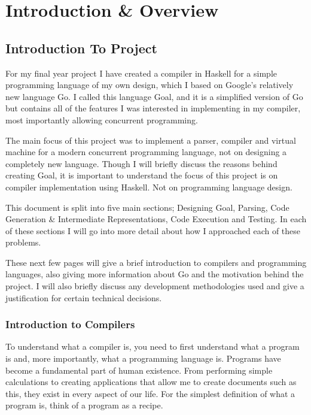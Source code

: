 
\chapter{Introduction \& Overview}

\section{Introduction To Project}

For my final year project I have created a compiler in Haskell for a simple programming language of my own design, which I based on Google's relatively new language Go. I called this language Goal, and it is a simplified version of Go but contains all of the features I was interested in implementing in my compiler, most importantly allowing concurrent programming.

The main focus of this project was to implement a parser, compiler and virtual machine for a modern concurrent programming language, not on designing a completely new language. Though I will briefly discuss the reasons behind creating Goal, it is important to understand the focus of this project is on compiler implementation using Haskell. Not on programming language design.

This document is split into five main sections; Designing Goal, Parsing, Code Generation \& Intermediate Representations, Code Execution and Testing. In each of these sections I will go into more detail about how I approached each of these problems. 

These next few pages will give a brief introduction to compilers and programming languages, also giving more information about Go and the motivation behind the project. I will also briefly discuss any development methodologies used and give a justification for certain technical decisions.

\subsection{Introduction to Compilers}

To understand what a compiler is, you need to first understand what a program is and, more importantly, what a programming language is. Programs have become a fundamental part of human existence. From performing simple calculations to creating applications that allow me to create documents such as this, they exist in every aspect of our life. For the simplest definition of what a program is, think of a program as a recipe.  

